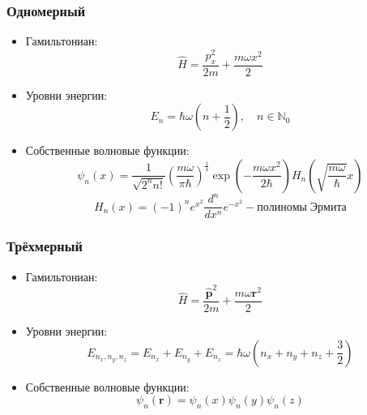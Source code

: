 \documentclass[12pt]{article}
\theoremstyle{definition}
\begin{document}
\subsubsection{Одномерный}
\begin{itemize}
    \item Гамильтониан:
    \begin{equation}
        \hat{H}=\frac{p_x^2}{2m}+\frac{m\omega x^2}{2}
    \end{equation}
    \item Уровни энергии:
    \begin{equation}
        E_n=\hbar\omega\left(n+\frac{1}{2}\right),\quad n\in\mathbb{N}_0
    \end{equation}
    \item Собственные волновые функции:
    \begin{equation}
        \psi_n(x)=\frac{1}{\sqrt{2^nn!}}\left(\frac{m\omega}{\pi\hbar}\right)^\frac{1}{4}\exp\left(-\frac{m\omega x^2}{2\hbar}\right)H_n\left(\sqrt{\frac{m\omega}{\hbar}}x\right)
    \end{equation}
    \begin{equation}
        H_n(x)=(-1)^ne^{x^2}\frac{d^n}{dx^n}e^{-x^2} - полиномы\; Эрмита
    \end{equation}
\end{itemize}
\subsubsection{Трёхмерный}
\begin{itemize}
    \item Гамильтониан:
    \begin{equation}
        \hat{H}=\frac{\hat{\textbf{p}}^2}{2m}+\frac{m\omega \textbf{r}^2}{2}
    \end{equation}
    \item Уровни энергии:
    \begin{equation}
        E_{n_x,n_y,n_z}=E_{n_x}+E_{n_y}+E_{n_z}=\hbar\omega\left(n_x+n_y+n_z+\frac{3}{2}\right)
    \end{equation}
    \item Собственные волновые функции:
    \begin{equation}
        \psi_n(\textbf{r})=\psi_n(x)\psi_n(y)\psi_n(z)
    \end{equation}
\end{itemize}
\end{document}
